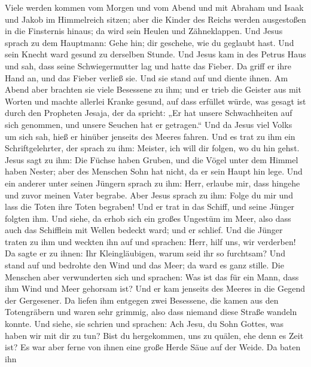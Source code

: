 Viele werden kommen vom Morgen und vom Abend und mit Abraham und Isaak
und Jakob im Himmelreich sitzen;  aber die Kinder des
Reichs werden ausgestoßen in die Finsternis hinaus; da wird sein Heulen
und Zähneklappen.  Und Jesus sprach zu dem Hauptmann: Gehe
hin; dir geschehe, wie du geglaubt hast. Und sein Knecht ward gesund zu
derselben Stunde.  Und Jesus kam in des Petrus Haus und
sah, dass seine Schwiegermutter lag und hatte das Fieber. 
Da griff er ihre Hand an, und das Fieber verließ sie. Und sie stand auf
und diente ihnen.  Am Abend aber brachten sie viele
Besessene zu ihm; und er trieb die Geister aus mit Worten und machte
allerlei Kranke gesund,  auf dass erfüllet würde, was
gesagt ist durch den Propheten Jesaja, der da spricht: „Er hat unsere
Schwachheiten auf sich genommen, und unsere Seuchen hat er getragen.``
 Und da Jesus viel Volks um sich sah, hieß er hinüber
jenseits des Meeres fahren.  Und es trat zu ihm ein
Schriftgelehrter, der sprach zu ihm: Meister, ich will dir folgen, wo du
hin gehst.  Jesus sagt zu ihm: Die Füchse haben Gruben, und
die Vögel unter dem Himmel haben Nester; aber des Menschen Sohn hat
nicht, da er sein Haupt hin lege.  Und ein anderer unter
seinen Jüngern sprach zu ihm: Herr, erlaube mir, dass hingehe und zuvor
meinen Vater begrabe.  Aber Jesus sprach zu ihm: Folge du
mir und lass die Toten ihre Toten begraben!  Und er trat in
das Schiff, und seine Jünger folgten ihm.  Und siehe, da
erhob sich ein großes Ungestüm im Meer, also dass auch das Schifflein
mit Wellen bedeckt ward; und er schlief.  Und die Jünger
traten zu ihm und weckten ihn auf und sprachen: Herr, hilf uns, wir
verderben!  Da sagte er zu ihnen: Ihr Kleingläubigen, warum
seid ihr so furchtsam? Und stand auf und bedrohte den Wind und das Meer;
da ward es ganz stille.  Die Menschen aber verwunderten
sich und sprachen: Was ist das für ein Mann, dass ihm Wind und Meer
gehorsam ist?  Und er kam jenseits des Meeres in die Gegend
der Gergesener. Da liefen ihm entgegen zwei Besessene, die kamen aus den
Totengräbern und waren sehr grimmig, also dass niemand diese Straße
wandeln konnte.  Und siehe, sie schrien und sprachen: Ach
Jesu, du Sohn Gottes, was haben wir mit dir zu tun? Bist du hergekommen,
uns zu quälen, ehe denn es Zeit ist?  Es war aber ferne von
ihnen eine große Herde Säue auf der Weide.  Da baten ihn
